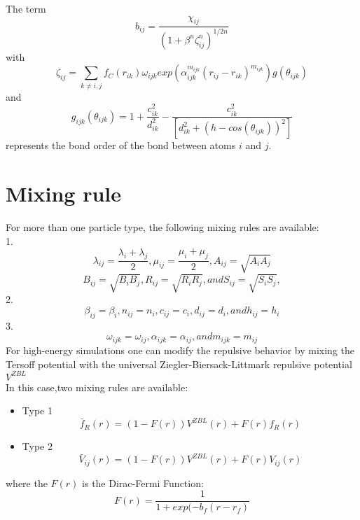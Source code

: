 The term 
\begin{equation*}
b_{ij}=\frac{\chi_{ij}}{(1+ \beta^n \zeta_{ij}^n)^{1/2n}}
\end{equation*}
with
\begin{equation*}
\zeta_{ij}= \sum_{k \neq i,j} f_{C}(r_{ik})\omega_{ijk}exp(\alpha_{ijk}^{m_{ijk}} (r_{ij}-r_{ik})^{m_{ijk}})g(\theta_{ijk})
\end{equation*}
and
\begin{equation*}
g_{ijk}(\theta_{ijk})=1+\frac{c_{ik}^2}{d_{ik}^2}-\frac{c_{ik}^2}{[d_{ik}^2+(h- cos(\theta_{ijk}))^2]}
\end{equation*}
represents the bond order of the bond between atoms $i$ and $j$.
\section*{Mixing rule}
For more than one particle type, the following mixing rules\cite{mixing1,mixing2} are available:\\
1.$$
\lambda_{ij}=\frac{\lambda_i+\lambda_j}{2},\mu_{ij}=\frac{\mu_i+\mu_j}{2},A_{ij}=\sqrt{A_i A_j}
$$
$$
B_{ij}=\sqrt{B_i B_j},R_{ij}=\sqrt{R_i R_j}, and S_{ij}=\sqrt{S_i S_j},
$$
2.$$
\beta_{ij}=\beta_i,n_{ij}=n_i,c_{ij}=c_i,d_{ij}=d_i, and h_{ij}=h_i
$$
3.$$
\omega_{ijk}=\omega_{ij},\alpha_{ijk}=\alpha_{ij}, and m_{ijk}=m_{ij}
$$
For high-energy simulations one can modify the repulsive behavior by mixing the Tersoff potential with the universal Ziegler-Biersack-Littmark repulsive potential\cite{mixing3}
$V^{ZBL}$\\
In this case,two mixing rules are available:
\begin{itemize}
\item Type 1
$$
\bar{f}_R(r)=(1-F(r))V^{ZBL}(r)+F(r)f_R(r)
$$
\item Type 2
$$
\bar{V}_{ij}(r)=(1-F(r))V^{ZBL}(r)+F(r)V_{ij}(r)
$$
\end{itemize}
where the $F(r)$ is the Dirac-Fermi Function:
$$
F(r)=\frac{1}{1+exp(-b_f(r-r_f)}
$$






